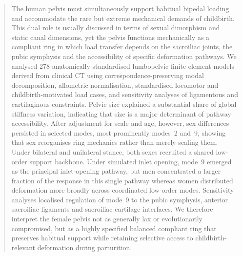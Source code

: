 \documentclass[openacc]{rsproca_new}
\begin{document}
\begin{abstract}
The human pelvis must simultaneously support habitual bipedal loading and accommodate the rare but extreme mechanical demands of childbirth. This dual role is usually discussed in terms of sexual dimorphism and static canal dimensions, yet the pelvis functions mechanically as a compliant ring in which load transfer depends on the sacroiliac joints, the pubic symphysis and the accessibility of specific deformation pathways. We analysed 278 anatomically standardised lumbopelvic finite-element models derived from clinical CT using correspondence-preserving modal decomposition, allometric normalisation, standardised locomotor and childbirth-motivated load cases, and sensitivity analyses of ligamentous and cartilaginous constraints. Pelvic size explained a substantial share of global stiffness variation, indicating that size is a major determinant of pathway accessibility. After adjustment for scale and age, however, sex differences persisted in selected modes, most prominently modes~2 and~9, showing that sex reorganises ring mechanics rather than merely scaling them. Under bilateral and unilateral stance, both sexes recruited a shared low-order support backbone. Under simulated inlet opening, mode~9 emerged as the principal inlet-opening pathway, but men concentrated a larger fraction of the response in this single pathway whereas women distributed deformation more broadly across coordinated low-order modes. Sensitivity analyses localised regulation of mode~9 to the pubic symphysis, anterior sacroiliac ligaments and sacroiliac cartilage interfaces. We therefore interpret the female pelvis not as generally lax or evolutionarily compromised, but as a highly specified balanced compliant ring that preserves habitual support while retaining selective access to childbirth-relevant deformation during parturition.
\end{abstract}

\maketitle
\end{document}
